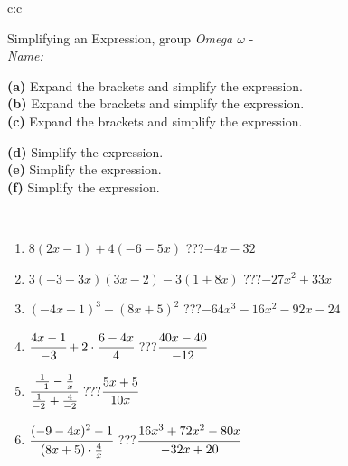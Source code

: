 \documentclass[10pt]{report}
\begin{document}
\newpage
\thispagestyle{empty}
\begin{tabular}{c:c}
\begin{minipage}[c][104.5mm][t]{0.5\linewidth}
\begin{center}
\vspace{7mm}
{\huge Simplifying an Expression, group \textit{Omega $\omega$} -}\\[5mm]
\textit{Name:}\phantom{xxxxxxxxxxxxxxxxxxxxxxxxxxxxxxxxxxxxxxxxxxxxxxxxxxxxxxxxxxxxxxxxx}\\[5mm]
\begin{minipage}{0.95\linewidth}
\begin{center}
{\small \begin{minipage}{0.6\textwidth}
\textbf{(a)} Expand the brackets and simplify the expression. \\[1mm]
\textbf{(b)} Expand the brackets and simplify the expression. \\[1mm]
\textbf{(c)} Expand the brackets and simplify the expression.
\end{minipage} \begin{minipage}{0.39\textwidth}
\textbf{(d)} Simplify the expression. \\[1mm]
\textbf{(e)} Simplify the expression. \\[1mm]
\textbf{(f)} Simplify the expression.
\end{minipage}
}
\end{center}
\end{minipage}
\\[4mm]
\begin{minipage}{0.79\linewidth}
\begin{center}
\begin{varwidth}{\linewidth}
\begin{enumerate}
\normalsize
\item $8(2x-1)+4(-6-5x)$\quad \dotfill\; ???\;\dotfill \quad $-4x-32$
\item $3(-3-3x)(3x-2)-3(1+8x)$\quad \dotfill\; ???\;\dotfill \quad $-27x^2+33x$
\item $(-4x+1)^3-(8x+5)^2$\quad \dotfill\; ???\;\dotfill \quad $-64x^3-16x^2-92x-24$
\item $\cfrac{4x-1}{-3}+2\cdot\cfrac{6-4x}{4}$\quad \dotfill\; ???\;\dotfill \quad $\cfrac{40x-40}{-12}$
\item $\cfrac{\frac{1}{-1}-\frac{1}{x}}{\frac{1}{-2}+\frac{4}{-2}}$\quad \dotfill\; ???\;\dotfill \quad $\cfrac{5x+5}{10x}$
\item $\cfrac{(-9-4x)^2-1}{(8x+5)\cdot\frac{4}{x}}$\quad \dotfill\; ???\;\dotfill \quad $\cfrac{16x^3+72x^2-80x}{-32x+20}$

\end{enumerate}
\end{varwidth}
\end{center}
\end{minipage}
\end{center}
\end{minipage}
\end{tabular}
\end{document}
